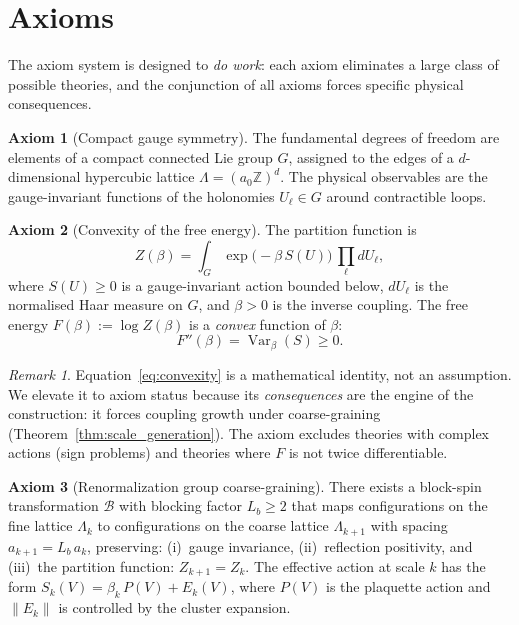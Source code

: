 \documentclass[12pt]{article}
\theoremstyle{definition}
\newtheorem{axiom}{Axiom}
\theoremstyle{remark}
\newtheorem{remark}[theorem]{Remark}
\newcommand{\Var}{\operatorname{Var}}
\newcommand{\Z}{\mathbb{Z}}
\begin{document}
\section{Axioms}
\label{sec:axioms}

The axiom system is designed to \emph{do work}: each axiom
eliminates a large class of possible theories, and the conjunction
of all axioms forces specific physical consequences.

\begin{axiom}[Compact gauge symmetry]
\label{ax:gauge}
The fundamental degrees of freedom are elements of a compact
connected Lie group $G$, assigned to the edges of a $d$-dimensional
hypercubic lattice $\Lambda = (a_0\Z)^d$.
The physical observables are the gauge-invariant functions of the
holonomies $U_\ell \in G$ around contractible loops.
\end{axiom}

\begin{axiom}[Convexity of the free energy]
\label{ax:convexity}
The partition function is
\begin{equation}\label{eq:Z}
Z(\beta) = \int_G \exp\bigl(-\beta\,S(U)\bigr)\,\prod_\ell dU_\ell,
\end{equation}
where $S(U) \ge 0$ is a gauge-invariant action bounded below,
$dU_\ell$ is the normalised Haar measure on $G$, and $\beta > 0$
is the inverse coupling. The free energy $F(\beta) := \log Z(\beta)$
is a \emph{convex} function of $\beta$:
\begin{equation}\label{eq:convexity}
F''(\beta) = \Var_\beta(S) \ge 0.
\end{equation}
\end{axiom}

\begin{remark}
Equation~\eqref{eq:convexity} is a mathematical identity, not an
assumption.  We elevate it to axiom status because its
\emph{consequences} are the engine of the construction: it forces
coupling growth under coarse-graining
(Theorem~\ref{thm:scale_generation}).  The axiom excludes theories
with complex actions (sign problems) and theories where $F$ is not
twice differentiable.
\end{remark}

\begin{axiom}[Renormalization group coarse-graining]
\label{ax:rg}
There exists a block-spin transformation $\mathcal{B}$ with
blocking factor $L_b \ge 2$ that maps configurations on the fine
lattice $\Lambda_k$ to configurations on the coarse lattice
$\Lambda_{k+1}$ with spacing $a_{k+1} = L_b\,a_k$, preserving:
(i)~gauge invariance,
(ii)~reflection positivity, and
(iii)~the partition function: $Z_{k+1} = Z_k$.
The effective action at scale $k$ has the form
$S_k(V) = \beta_k\,P(V) + E_k(V)$, where $P(V)$ is the plaquette
action and $\|E_k\|$ is controlled by the cluster expansion.
\end{axiom}
\end{document}
